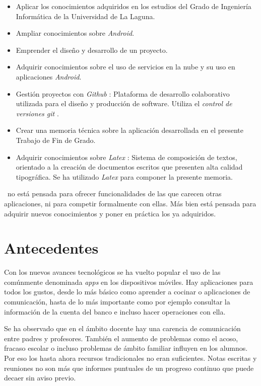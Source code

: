 		\begin{itemize}
			\item Aplicar los conocimientos adquiridos en los estudios del Grado de Ingeniería Informática de la Universidad de La Laguna.
			\item Ampliar conocimientos sobre {\it Android}.
			\item Emprender el diseño y desarrollo de un proyecto.
			\item Adquirir conocimientos sobre el uso de servicios en la nube y su uso en aplicaciones {\it Android}.
			\item Gestión proyectos con {\it Github} \cite{9:github:online}: Plataforma de desarrollo colaborativo utilizada para el diseño y producción de software. Utiliza el {\it control de versiones git} \cite{5:git:online}.
			\item Crear una memoria técnica sobre la aplicación desarrollada en el presente Trabajo de Fin de Grado.
			\item Adquirir conocimientos sobre {\it Latex} \cite{8:latex:online}: Sistema de composición de textos, orientado a la creación de documentos escritos que presenten alta calidad tipográfica. Se ha utilizado {\it Latex} para componer la presente memoria.
		\end{itemize}
			
		\CollegeApp\ no está pensada para ofrecer funcionalidades de las que carecen otras aplicaciones, ni para competir formalmente con ellas. Más bien está pensada para adquirir nuevos conocimientos y poner en práctica los ya adquiridos.
		
	\section{Antecedentes}
	
		Con los nuevos avances tecnológicos se ha vuelto popular el uso de las comúnmente denominada {\it apps} en los dispositivos móviles. Hay aplicaciones para todos los gustos, desde lo más básico como aprender a cocinar o aplicaciones de comunicación, hasta de lo más importante como por ejemplo consultar la información de la cuenta del banco e incluso hacer operaciones con ella.
		
		\bigskip
		Se ha observado que en el ámbito docente hay una carencia de comunicación entre padres y profesores. También el aumento de problemas como el acoso, fracaso escolar o incluso problemas de ámbito familiar influyen en los alumnos. Por eso los hasta ahora recursos tradicionales no eran suficientes. Notas escritas y reuniones no son más que informes puntuales de un progreso continuo que puede decaer sin aviso previo.
		
